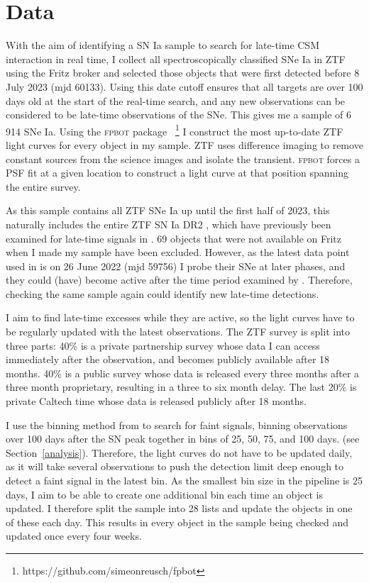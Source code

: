 \documentclass[a4paper,oneside,12pt, class=Latex/Classes/PhDthesisPSnPDF, crop=false]{standalone}
\begin{document}
\section{Data}
\label{data}
With the aim of identifying a SN Ia sample to search for late-time CSM interaction in real time, I collect all spectroscopically classified SNe Ia in ZTF using the Fritz broker \citep{skyportal2019, Skyportal} and selected those objects that were first detected before 8 July 2023 (mjd 60133). Using this date cutoff ensures that all targets are over 100 days old at the start of the real-time search, and any new observations can be considered to be late-time observations of the SNe. This gives me a sample of 6\,914 SNe Ia. Using the \textsc{fpbot} package \cite{fpbot}~\footnote{https://github.com/simeonreusch/fpbot} I construct the most up-to-date ZTF light curves for every object in my sample. ZTF uses difference imaging to remove constant sources from the science images and isolate the transient. \textsc{fpbot} forces a PSF fit at a given location to construct a light curve at that position spanning the entire survey.

As this sample contains all ZTF SNe Ia up until the first half of 2023, this naturally includes the entire ZTF SN Ia DR2 \citep[][Smith et al. in prep]{DR2_Overview}, which have previously been examined for late-time signals in \citet{Terwel_2024_paper1}. 69 objects that were not available on Fritz when I made my sample have been excluded. However, as the latest data point used in \citet{Terwel_2024_paper1} is on 26 June 2022 (mjd 59756) I probe their SNe at later phases, and they could (have) become active after the time period examined by \citet{Terwel_2024_paper1}. Therefore, checking the same sample again could identify new late-time detections.

I aim to find late-time excesses while they are active, so the light curves have to be regularly updated with the latest observations. The ZTF survey is split into three parts: 40\% is a private partnership survey whose data I can access immediately after the observation, and becomes publicly available after 18 months. 40\% is a public survey whose data is released every three months after a three month proprietary, resulting in a three to six month delay. The last 20\% is private Caltech time whose data is released publicly after 18 months.

I use the binning method from \citet{Terwel_2024_paper1} to search for faint signals, binning observations over 100 days after the SN peak together in bins of 25, 50, 75, and 100 days. (see Section~\ref{analysis}). Therefore, the light curves do not have to be updated daily, as it will take several observations to push the detection limit deep enough to detect a faint signal in the latest bin. As the smallest bin size in the pipeline is 25 days, I aim to be able to create one additional bin each time an object is updated. I therefore split the sample into 28 lists and update the objects in one of these each day. This results in every object in the sample being checked and updated once every four weeks.
\end{document}
